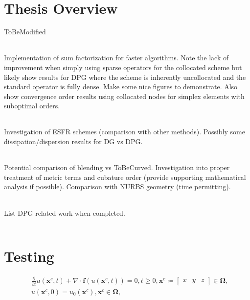 \documentclass[12pt,Bold,letterpaper,TexShade]{mcgilletdclass}
\numberwithin{equation}{section}
\begin{document}
\section{Thesis Overview}
{\color{red} ToBeModified}
\\~

Implementation of sum factorization for faster algorithms. Note the lack of improvement when simply using sparse operators for the collocated scheme but likely show results for DPG where the scheme is inherently uncollocated and the standard operator is fully dense. Make some nice figures to demonstrate. Also show convergence order results using collocated nodes for simplex elements with suboptimal orders.
\\~

Investigation of ESFR schemes (comparison with other methods). Possibly some dissipation/dispersion results for DG vs DPG.
\\~

Potential comparison of blending vs ToBeCurved. Investigation into proper treatment of metric terms and cubature order (provide supporting mathematical analysis if possible). Comparison with NURBS geometry (time permitting).
\\~

{\color{red} List DPG related work when completed.}
\\~

\section{Testing}
\label{sec:NumericalResults}


\begin{equation} \nonumber
\begin{split}
& \frac{\partial}{\partial t} u(\boldsymbol x^{c},t) + \nabla \cdot \boldsymbol f(u(\boldsymbol x^{c},t)) = 0, t \ge 0, 
\boldsymbol x^{c} \coloneqq
\begin{bmatrix} x & y & z \end{bmatrix} \in \boldsymbol \Omega, \\
& u(\boldsymbol x^{c},0) = u_0(\boldsymbol x^{c}), \boldsymbol x^{c} \in \boldsymbol \Omega,
\end{split}
\end{equation}
\end{document}
